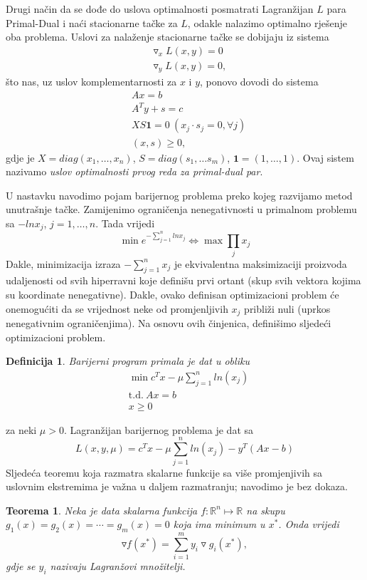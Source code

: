 \documentclass[b5paper, utf8, 11pt, colorlinks]{book}
\newtheorem{definition}{Definicija}[chapter]
\newtheorem{thm}{Teorema}[chapter]
\theoremstyle{definition}
\begin{document}
Drugi način da se dođe do uslova optimalnosti posmatrati Lagranžijan $L$ para Primal-Dual i naći stacionarne tačke za $L$, odakle nalazimo optimalno rješenje oba problema.  Uslovi za nalaženje stacionarne tačke se dobijaju iz sistema
\begin{align}
	&\triangledown_x L(x,y) = 0\\
	&\triangledown_y L(x,y) = 0,
\end{align} 
što nas, uz uslov komplementarnosti za $x$ i $y$, ponovo dovodi do sistema
\begin{align}
	&Ax = b \\
	&A^T y + s = c \\
	&XS\mathbf{1} = 0 \ (x_j \cdot s_j =0 , \forall j) \\
	&  (x, s ) \geq 0,
\end{align}
gdje je $X = diag (x_1, \ldots, x_n)$, $S= diag(s_1,\ldots s_m)$, $\mathbf{1}=(1,\ldots, 1)$. Ovaj sistem nazivamo \emph{uslov optimalnosti prvog reda za primal-dual par}. 

U nastavku navodimo pojam barijernog problema preko kojeg razvijamo metod unutrašnje tačke. Zamijenimo ograničenja nenegativnosti u primalnom problemu sa $-ln x_j$, $j=1,\ldots,n$.   
Tada vrijedi 
$$\min e^{-\sum_{j=1}^n ln x_j} \Leftrightarrow \max \prod_{j} x_j $$
Dakle, minimizacija izraza $-\sum_{j=1}^n x_j$ je ekvivalentna maksimizaciji proizvoda udaljenosti od svih hiperravni koje definišu prvi ortant (skup svih vektora kojima su koordinate nenegativne). Dakle, ovako definisan optimizacioni problem će onemogućiti da se vrijednost neke od promjenljivih $x_j$ približi nuli (uprkos nenegativnim ograničenjima).  Na osnovu ovih činjenica, definišimo sljedeći optimizacioni problem. 

\begin{definition}
	Barijerni program  primala je dat u obliku 
	\begin{align*}
		&\min c^T x - \mu \sum_{j=1}^n ln(x_j) \\
		&{\mbox{t.d.} \ } A x = b \\
		& x \geq 0
	\end{align*}
\end{definition}
za neki $\mu >0$. Lagranžijan barijernog problema je dat sa 
$$  L(x, y, \mu) = c^T x - \mu \sum_{j=1}^n ln(x_j)  - y^T(Ax - b) $$
Sljedeća teoremu koja razmatra skalarne funkcije sa više promjenjivih sa uslovnim ekstremima je važna u daljem razmatranju; navodimo  je bez dokaza. 
\begin{thm}
	Neka je data skalarna funkcija  $f:\mathbb{R}^n \mapsto \mathbb{R}$ na skupu $g_1(x)=g_2(x)= \cdots = g_m(x) =0$ koja ima minimum u $x^*$. Onda vrijedi 
	$$ \triangledown f (x^*) = \sum_{i=1}^m y_i \triangledown g_i(x^*),$$
	gdje se $y_i$ nazivaju Lagranžovi množitelji. 
\end{thm}
\end{document}
